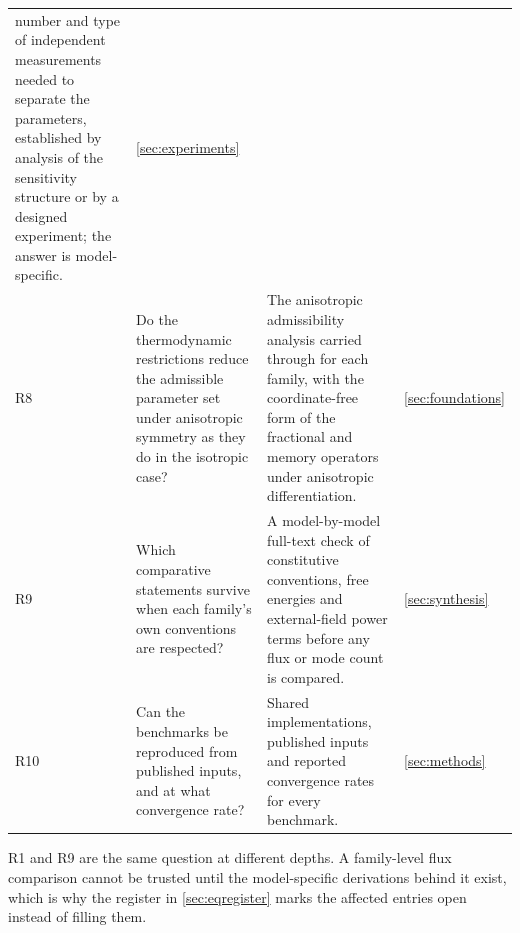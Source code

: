 \begin{table}[H]
\begin{tabularx}{\textwidth}{@{}p{0.5cm}Y Y p{1.75cm}@{}}
  number and type of independent measurements needed to separate the parameters, established by analysis
  of the sensitivity structure or by a designed experiment; the answer is model-specific. &
  \cref{sec:experiments} \\
R8 & Do the thermodynamic restrictions reduce the admissible parameter set under anisotropic symmetry as
  they do in the isotropic case? & The anisotropic admissibility analysis carried through for each family,
  with the coordinate-free form of the fractional and memory operators under anisotropic differentiation.
  & \cref{sec:foundations} \\
R9 & Which comparative statements survive when each family's own conventions are respected? & A
  model-by-model full-text check of constitutive conventions, free energies and external-field power terms
  before any flux or mode count is compared. & \cref{sec:synthesis} \\
R10 & Can the benchmarks be reproduced from published inputs, and at what convergence rate? & Shared
  implementations, published inputs and reported convergence rates for every benchmark. &
  \cref{sec:methods} \\
\bottomrule
\end{tabularx}
\end{table}

R1 and R9 are the same question at different depths. A family-level flux comparison cannot be trusted
until the model-specific derivations behind it exist, which is why the register in \cref{sec:eqregister}
marks the affected entries open instead of filling them.


